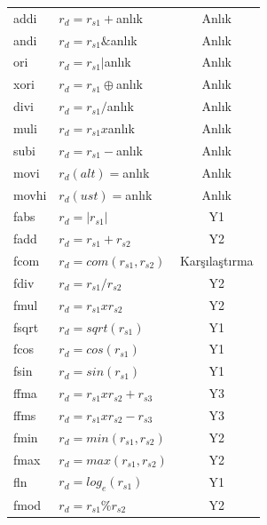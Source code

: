\begin{longtable}{p{50pt} p{250pt} p{70pt}}
\hline \hline
\endlastfoot
  addi		&	 $r_{d} = r_{s1} + 			$anlık 	& \multicolumn{1}{c}{Anlık} 	\\
  andi 		&	 $r_{d} = r_{s1} \& 		$anlık 	& \multicolumn{1}{c}{Anlık}  	\\
  ori 		&	 $r_{d} = r_{s1} | 			$anlık  & \multicolumn{1}{c}{Anlık}  	\\
  xori 		&	 $r_{d} = r_{s1} \oplus $anlık 	& \multicolumn{1}{c}{Anlık}  	\\
  divi 		&	 $r_{d} = r_{s1} / 			$anlık  & \multicolumn{1}{c}{Anlık}  	\\
  muli 		&	 $r_{d} = r_{s1} x 			$anlık  & \multicolumn{1}{c}{Anlık}  	\\
  subi 		&	 $r_{d} = r_{s1} - 			$anlık  & \multicolumn{1}{c}{Anlık}  	\\
  movi 		&	 $r_{d}(alt) = 	$anlık  & \multicolumn{1}{c}{Anlık}  	\\
  movhi		&	 $r_{d}(ust) = 	$anlık  & \multicolumn{1}{c}{Anlık}  	\\
  fabs  	&  $r_{d} = |r_{s1}|			$				&	\multicolumn{1}{c}{Y1}		 	\\
  fadd  	&  $r_{d} = r_{s1} + r_{s2}$			&	\multicolumn{1}{c}{Y2}		 	\\
  fcom  	&  $r_{d} = com(r_{s1},r_{s2})$		&	\multicolumn{1}{c}{Karşılaştırma}	 	\\
  fdiv  	&  $r_{d} = r_{s1} / r_{s2}$			&	\multicolumn{1}{c}{Y2}		 	\\
  fmul  	&  $r_{d} = r_{s1} x r_{s2}$			&	\multicolumn{1}{c}{Y2}		 	\\
  fsqrt  	&  $r_{d} = sqrt(r_{s1})$					&	\multicolumn{1}{c}{Y1}		 	\\
  fcos  	&  $r_{d} = cos(r_{s1})$					&	\multicolumn{1}{c}{Y1}		 	\\
  fsin  	&  $r_{d} = sin(r_{s1})$					&	\multicolumn{1}{c}{Y1}		 	\\
  ffma  	&  $r_{d} = r_{s1}xr_{s2}+r_{s3}$	&	\multicolumn{1}{c}{Y3}		 	\\
  ffms  	&  $r_{d} = r_{s1}xr_{s2}-r_{s3}$	&	\multicolumn{1}{c}{Y3}		 	\\
  fmin  	&  $r_{d} = min(r_{s1},r_{s2})$		&	\multicolumn{1}{c}{Y2}		 	\\
  fmax  	&  $r_{d} = max(r_{s1},r_{s2})$		& \multicolumn{1}{c}{Y2}			\\
  fln 	 	&	 $r_{d} = log_{e}(r_{s1})$			& \multicolumn{1}{c}{Y1}			\\
  fmod 		&	 $r_{d} = r_{s1} \% r_{s2} $ 		& \multicolumn{1}{c}{Y2}  		\\

\end{longtable}
